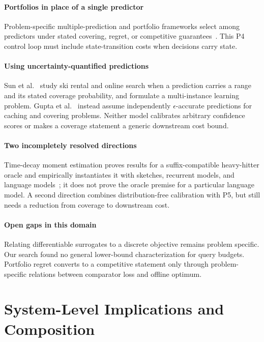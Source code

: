 \documentclass[acmsmall,screen,nonacm]{acmart}
\theoremstyle{acmdefinition}%
\begin{document}
\paragraph{Portfolios in place of a single predictor}
Problem-specific multiple-prediction and portfolio frameworks select among predictors under stated covering, regret, or competitive guarantees~\cite{anand2022multiple,dinitz2022portfolios}. This P4 control loop must include state-transition costs when decisions carry state.

\paragraph{Using uncertainty-quantified predictions}
Sun et al.~\cite{sun2024uncertainty} study ski rental and online search when a prediction carries a range and its stated coverage probability, and formulate a multi-instance learning problem. Gupta et al.~\cite{gupta2022epsilon} instead assume independently $\epsilon$-accurate predictions for caching and covering problems. Neither model calibrates arbitrary confidence scores or makes a coverage statement a generic downstream cost bound.

\paragraph{Two incompletely resolved directions}
Time-decay moment estimation proves results for a suffix-compatible heavy-hitter oracle and empirically instantiates it with sketches, recurrent models, and language models~\cite{nagawanshi2026moment}; it does not prove the oracle premise for a particular language model. A second direction combines distribution-free calibration with P5, but still needs a reduction from coverage to downstream cost.

\paragraph*{Open gaps in this domain}
Relating differentiable surrogates to a discrete objective remains problem specific. Our search found no general lower-bound characterization for query budgets. Portfolio regret converts to a competitive statement only through problem-specific relations between comparator loss and offline optimum.

%
\section{System-Level Implications and Composition}
\label{sec:las_architecture}
\end{document}
